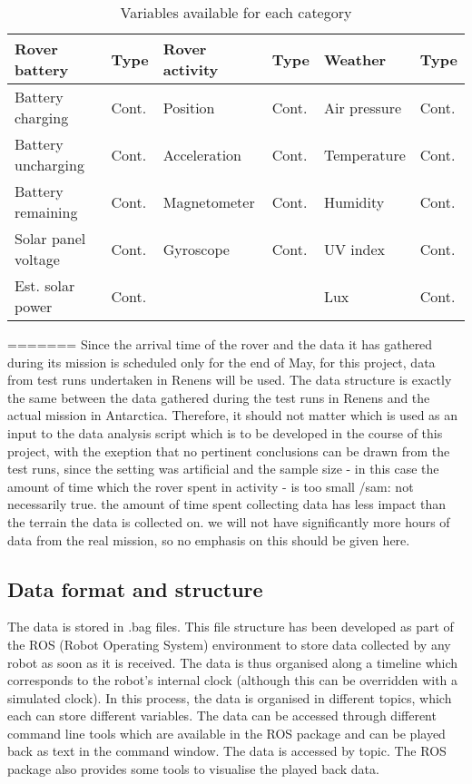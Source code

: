 \documentclass[11pt, UKenglish]{report}
\begin{document}
{\begin{table}[h]
\centering\captionsetup{font=footnotesize}	
\caption{Variables available for each category}
\label{tabdimension}
\begin{tabularx}{0.85\textwidth}{@{} l l | l l | l l @{}}
 \toprule
 Rover battery & Type & Rover activity & Type & Weather & Type \\  
 \midrule
 Battery charging & Cont. & Position & Cont. & Air pressure & Cont. \\ 
 Battery uncharging & Cont. & Acceleration & Cont. & Temperature & Cont. \\
 Battery remaining & Cont. & Magnetometer & Cont. & Humidity & Cont. \\
 Solar panel voltage & Cont. & Gyroscope & Cont. & UV index & Cont. \\
 Est. solar power & Cont. & & & Lux & Cont. \\ 
 \bottomrule
\end{tabularx}
\end{table}
=======
Since the arrival time of the rover and the data it has gathered during its mission is scheduled only for the end of May, for this project, data from test runs undertaken in Renens will be used. The data structure is exactly the same between the data gathered during the test runs in Renens and the actual mission in Antarctica. Therefore, it should not matter which is used as an input to the data analysis script which is to be developed in the course of this project, with the exeption that no pertinent conclusions can be drawn from the test runs, since the setting was artificial and the sample size - in this case the amount of time which the rover spent in activity - is too small /sam: {not necessarily true. the amount of time spent collecting data has less impact than the terrain the data is collected on. we will not have significantly more hours of data from the real mission, so no emphasis on this should be given here}.

\subsection*{Data format and structure}

The data is stored in .bag files. This file structure has been developed as part of the ROS (Robot Operating System) environment to store data collected by any robot as soon as it is received. The data is thus organised along a timeline which corresponds to the robot's internal clock (although this can be overridden with a simulated clock). In this process, the data is organised in different topics, which each can store different variables. The data can be accessed through different command line tools which are available in the ROS package and can be played back as text in the command window. The data is accessed by topic. The ROS package also provides some tools to visualise the played back data.

}
\end{document}
